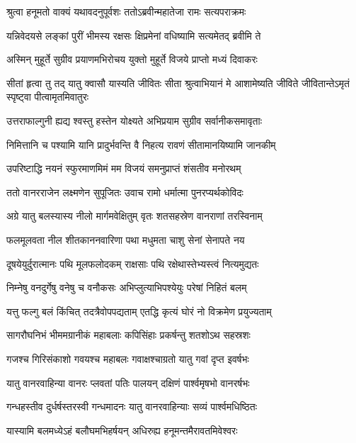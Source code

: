 
\twolineshloka
{श्रुत्वा हनूमतो वाक्यं यथावदनुपूर्वशः}
{ततोऽब्रवीन्महातेजा रामः सत्यपराक्रमः} %

\twolineshloka
{यन्निवेदयसे लङ्कां पुरीं भीमस्य रक्षसः}
{क्षिप्रमेनां वधिष्यामि सत्यमेतद् ब्रवीमि ते} %

\twolineshloka
{अस्मिन् मुहूर्ते सुग्रीव प्रयाणमभिरोचय}
{युक्तो मुहूर्ते विजये प्राप्तो मध्यं दिवाकरः} %

\threelineshloka
{सीतां हृत्वा तु तद् यातु क्वासौ यास्यति जीवितः}
{सीता श्रुत्वाभियानं मे आशामेष्यति जीविते}
{जीवितान्तेऽमृतं स्पृष्ट्वा पीत्वामृतमिवातुरः} %

\twolineshloka
{उत्तराफाल्गुनी ह्यद्य श्वस्तु हस्तेन योक्ष्यते}
{अभिप्रयाम सुग्रीव सर्वानीकसमावृताः} %

\twolineshloka
{निमित्तानि च पश्यामि यानि प्रादुर्भवन्ति वै}
{निहत्य रावणं सीतामानयिष्यामि जानकीम्} %

\twolineshloka
{उपरिष्टाद्धि नयनं स्फुरमाणमिमं मम}
{विजयं समनुप्राप्तं शंसतीव मनोरथम्} %

\twolineshloka
{ततो वानरराजेन लक्ष्मणेन सुपूजितः}
{उवाच रामो धर्मात्मा पुनरप्यर्थकोविदः} %

\twolineshloka
{अग्रे यातु बलस्यास्य नीलो मार्गमवेक्षितुम्}
{वृतः शतसहस्रेण वानराणां तरस्विनाम्} %

\twolineshloka
{फलमूलवता नील शीतकाननवारिणा}
{पथा मधुमता चाशु सेनां सेनापते नय} %

\twolineshloka
{दूषयेयुर्दुरात्मानः पथि मूलफलोदकम्}
{राक्षसाः पथि रक्षेथास्तेभ्यस्त्वं नित्यमुद्यतः} %

\twolineshloka
{निम्नेषु वनदुर्गेषु वनेषु च वनौकसः}
{अभिप्लुत्याभिपश्येयुः परेषां निहितं बलम्} %

\twolineshloka
{यत्तु फल्गु बलं किंचित् तदत्रैवोपपद्यताम्}
{एतद्धि कृत्यं घोरं नो विक्रमेण प्रयुज्यताम्} %

\twolineshloka
{सागरौघनिभं भीममग्रानीकं महाबलाः}
{कपिसिंहाः प्रकर्षन्तु शतशोऽथ सहस्रशः} %

\twolineshloka
{गजश्च गिरिसंकाशो गवयश्च महाबलः}
{गवाक्षश्चाग्रतो यातु गवां दृप्त इवर्षभः} %

\twolineshloka
{यातु वानरवाहिन्या वानरः प्लवतां पतिः}
{पालयन् दक्षिणं पार्श्वमृषभो वानरर्षभः} %

\twolineshloka
{गन्धहस्तीव दुर्धर्षस्तरस्वी गन्धमादनः}
{यातु वानरवाहिन्याः सव्यं पार्श्वमधिष्ठितः} %

\twolineshloka
{यास्यामि बलमध्येऽहं बलौघमभिहर्षयन्}
{अधिरुह्य हनूमन्तमैरावतमिवेश्वरः} %

